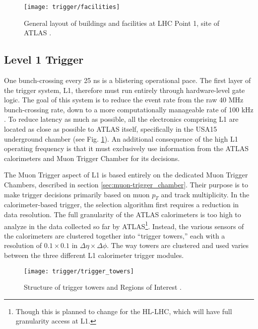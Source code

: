    \begin{figure}[h]
        \texttt{[image: trigger/facilities]}
        \caption{General layout of buildings and facilities at LHC Point 1, site of ATLAS \cite{trigger_tdr}.}
        \label{fig:facilities}
    \end{figure}


    \subsection{Level 1 Trigger}\label{sec:L1}

        One bunch-crossing every 25 ns is a blistering operational pace.
        The first layer of the trigger system, L1, therefore must run entirely through hardware-level gate logic.
        The goal of this system is to reduce the event rate from the raw 40 MHz bunch-crossing rate,
            down to a more computationally manageable rate of 100 kHz \cite{trigger_run2}.
        To reduce latency as much as possible, all the electronics comprising L1 are located as close as possible to ATLAS itself, specifically in the USA15 underground chamber \cite{trigger_tdr} (see Fig. \ref{fig:facilities}).
        An additional consequence of the high L1 operating frequency
            is that it must exclusively use information from the ATLAS calorimeters and Muon Trigger Chamber for its decisions.

        The Muon Trigger aspect of L1 is based entirely on the dedicated Muon Trigger Chambers,
            described in section \ref{sec:muon-trigger_chamber}.
        Their purpose is to make trigger decisions primarily based on muon $p_T$ and track multiplicity\cite{trigger_run1}.
        In the calorimeter-based trigger, the selection algorithm first requires a reduction in data resolution.
        The full granularity of the ATLAS calorimeters is too high to analyze in the data collected so far by ATLAS\footnote{
            Though this is planned to change for the HL-LHC, which will have full granularity access at L1.
        }.
        Instead, the various sensors of the calorimeters are clustered together into ``trigger towers,''
            each with a resolution of $0.1 \times 0.1$ in $\Delta \eta \times \Delta \phi$.
        The way towers are clustered and used varies between the three different L1 calorimeter trigger modules.

        \begin{figure}[h] \centering
            \texttt{[image: trigger/trigger\_towers]}
            \caption{Structure of trigger towers and Regions of Interest \cite{L1_calo_run1}.}
            \label{fig:trigger_towers}
        \end{figure}


